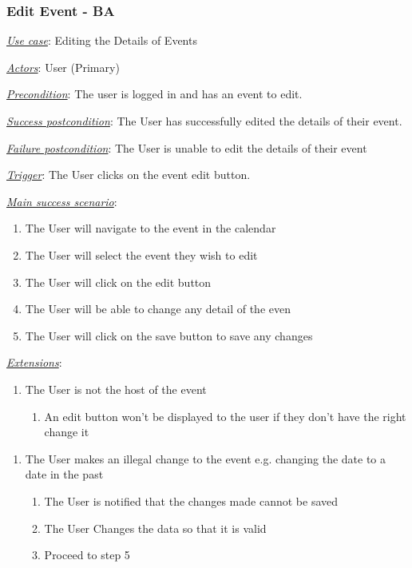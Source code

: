 \documentclass[a4paper]{article}
\begin{document}
\subsubsection{Edit Event - BA}
\underline{\textit{Use case}}: Editing the Details of Events

\underline{\textit{Actors}}: User (Primary)

\underline{\textit{Precondition}}: The user is logged in and has an event to edit.

\underline{\textit{Success postcondition}}: The User has successfully edited the details of their event.

\underline{\textit{Failure postcondition}}: The User is unable to edit the details of their event

\underline{\textit{Trigger}}: The User clicks on the event edit button.


\underline{\textit{Main success scenario}}: 
\begin{enumerate}[leftmargin = 3em]
    \item The User will navigate to the event in the calendar
    \item The User will select the event they wish to edit
    \item The User will click on the edit button
    \item The User will be able to change any detail of the even
    \item The User will click on the save button to save any changes
\end{enumerate} 

\underline{\textit{Extensions}}:
\begin{enumerate}[label=3\alph*, leftmargin = 3em]
    \item The User is not the host of the event \begin{enumerate}[label=\arabic*.]
        \item An edit button won’t be displayed to the user if they don’t have the right change it
    \end{enumerate}
\end{enumerate}

\begin{enumerate}[label=4\alph*, leftmargin = 3em]
    \item The User makes an illegal change to the event e.g. changing the date to a date in the past \begin{enumerate}[label=\arabic*.]
        \item The User is notified that the changes made cannot be saved
        \item The User Changes the data so that it is valid
        \item Proceed to step 5
    \end{enumerate}
\end{enumerate}
\end{document}
